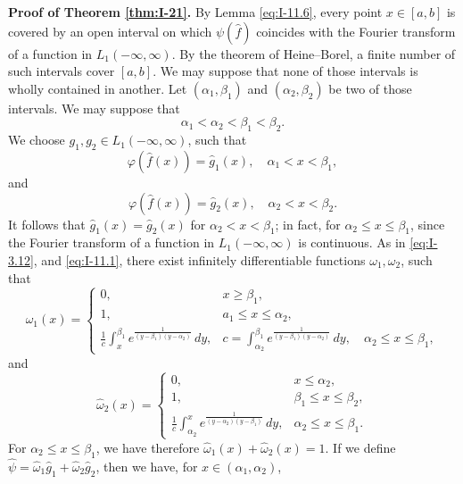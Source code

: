 \noindent\textbf{Proof of Theorem \ref{thm:I-21}.}
By Lemma \eqref{eq:I-11.6}, every point $x\in[a,b]$ is covered by an open interval on which $\psi(\widehat f)$ coincides with the Fourier transform of a function in $L_1(-\infty,\infty)$. By the theorem of Heine--Borel, a finite number of such intervals cover $[a,b]$. We may suppose that none of those intervals is wholly contained in another. Let $(\alpha_1,\beta_1)$ and $(\alpha_2,\beta_2)$ be two of those intervals. We may suppose that
\begin{equation*}
\alpha_1<\alpha_2<\beta_1<\beta_2.
\end{equation*}
We choose $g_1,g_2\in L_1(-\infty,\infty)$, such that
\begin{equation*}
\varphi(\widehat f(x))=\widehat g_1(x),\quad\alpha_1<x<\beta_1,
\end{equation*}
and
\begin{equation*}
\varphi(\widehat f(x))=\widehat g_2(x),\quad\alpha_2<x<\beta_2.
\end{equation*}
It follows that $\widehat g_1(x)=\widehat g_2(x)$ for $\alpha_2<x<\beta_1$; in fact, for $\alpha_2\le x\le\beta_1$, since the Fourier transform of a function in $L_1(-\infty,\infty)$ is continuous. As in \eqref{eq:I-3.12}, and \eqref{eq:I-11.1}, there exist infinitely differentiable functions $\omega_1,\omega_2$, such that
\begin{equation*}
\widehat\omega_1(x)=
\begin{cases}
0,&x\ge\beta_1,\\
1,&a_1\le x\le\alpha_2,\\
\frac{1}{c}\int_{x}^{\beta_1}e^{\frac{1}{(y-\beta_1)(y-\alpha_2)}}\,dy,&c=\int_{\alpha_2}^{\beta_1}e^{\frac{1}{(y-\beta_1)(y-\alpha_2)}}\,dy,\quad\alpha_2\le x\le\beta_1,
\end{cases}
\end{equation*}
and
\begin{equation*}
\widehat\omega_2(x)=
\begin{cases}
0,&x\le\alpha_2,\\
1,&\beta_1\le x\le\beta_2,\\
\frac{1}{c}\int_{\alpha_2}^{x}e^{\frac{1}{(y-\alpha_2)(y-\beta_1)}}\,dy,&\alpha_2\le x\le\beta_1.
\end{cases}
\end{equation*}
For $\alpha_2\le x\le\beta_1$, we have therefore $\widehat\omega_1(x)+\widehat\omega_2(x)=1$. If we define $\widehat\psi=\widehat\omega_1\widehat g_1+\widehat\omega_2\widehat g_2$, then we have, for $x\in(\alpha_1,\alpha_2)$,

